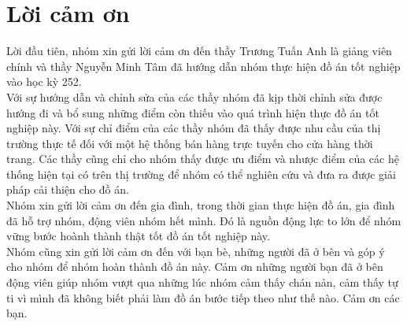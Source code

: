 \section*{Lời cảm ơn}
\thispagestyle{empty}

Lời đầu tiên, nhóm xin gửi lời cảm ơn đến thầy Trương Tuấn Anh là giảng viên chính và thầy Nguyễn Minh Tâm đã hướng dẫn nhóm thực hiện đồ án tốt nghiệp vào học kỳ 252. \\

Với sự hướng dẫn và chỉnh sửa của các thầy nhóm đã kịp thời chỉnh sửa được hướng đi và bổ sung những điểm còn thiếu vào quá trình hiện thực đồ án tốt nghiệp này. Với sự chỉ điểm của các thầy nhóm đã thấy được nhu cầu của thị trường thực tế đối với một hệ thống bán hàng trực tuyến cho cửa hàng thời trang. Các thầy cũng chỉ cho nhóm thấy được ưu điểm và nhược điểm của các hệ thống hiện tại có trên thị trường để nhóm có thể nghiên cứu và đưa ra được giải pháp cải thiện cho đồ án. \\

Nhóm xin gửi lời cảm ơn đến gia đình, trong thời gian thực hiện đồ án, gia đình đã hỗ trợ nhóm, động viên nhóm hết mình. Đó là nguồn động lực to lớn để nhóm vững bước hoành thành thật tốt đồ án tốt nghiệp này. \\

Nhóm cũng xin gửi lời cảm ơn đến với bạn bè, những người đã ở bên và góp ý cho nhóm để nhóm hoàn thành đồ án này. Cảm ơn những người bạn đã ở bên động viên giúp nhóm vượt qua những lúc nhóm cảm thấy chán nản,
cảm thấy tự ti vì mình đã không biết phải làm đồ án bước tiếp theo như thế nào. Cảm ơn các bạn.

\clearpage
{}
